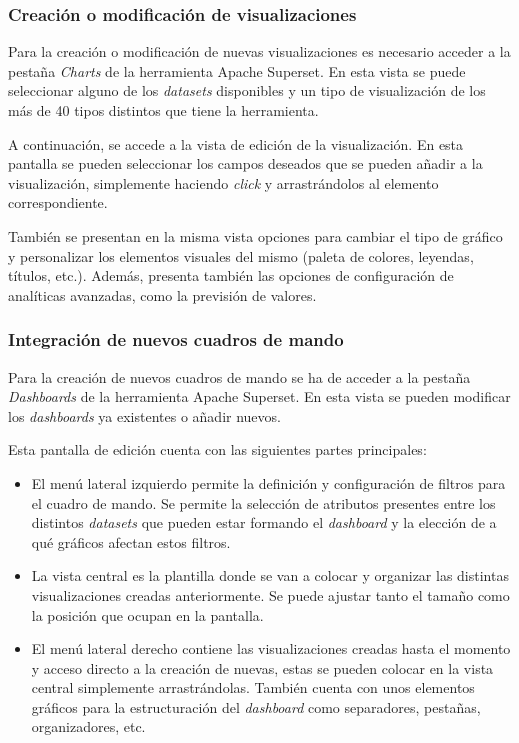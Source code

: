 
\subsubsection{Creación o modificación de visualizaciones}

Para la creación o modificación de nuevas visualizaciones es necesario acceder a la pestaña \textit{Charts} de la herramienta Apache Superset. En esta vista se puede seleccionar alguno de los \textit{datasets} disponibles y un tipo de visualización de los más de 40 tipos distintos que tiene la herramienta.

A continuación, se accede a la vista de edición de la visualización. En esta pantalla se pueden seleccionar los campos deseados que se pueden añadir a la visualización, simplemente haciendo \textit{click} y arrastrándolos al elemento correspondiente.


También se presentan en la misma vista opciones para cambiar el tipo de gráfico y personalizar los elementos visuales del mismo (paleta de colores, leyendas, títulos, etc.). Además, presenta también las opciones de configuración de analíticas avanzadas, como la previsión de valores.

\subsubsection{Integración de nuevos cuadros de mando}

Para la creación de nuevos cuadros de mando se ha de acceder a la pestaña \textit{Dashboards} de la herramienta Apache Superset. En esta vista se pueden modificar los \textit{dashboards} ya existentes o añadir nuevos.

Esta pantalla de edición cuenta con las siguientes partes principales:

\begin{itemize}
    \item El menú lateral izquierdo permite la definición y configuración de filtros para el cuadro de mando. Se permite la selección de atributos presentes entre los distintos \textit{datasets} que pueden estar formando el \textit{dashboard} y la elección de a qué gráficos afectan estos filtros.

    \item La vista central es la plantilla donde se van a colocar y organizar las distintas visualizaciones creadas anteriormente. Se puede ajustar tanto el tamaño como la posición que ocupan en la pantalla.

    \item El menú lateral derecho contiene las visualizaciones creadas hasta el momento y acceso directo a la creación de nuevas, estas se pueden colocar en la vista central simplemente arrastrándolas. También cuenta con unos elementos gráficos para la estructuración del \textit{dashboard} como separadores, pestañas, organizadores, etc.
\end{itemize}
